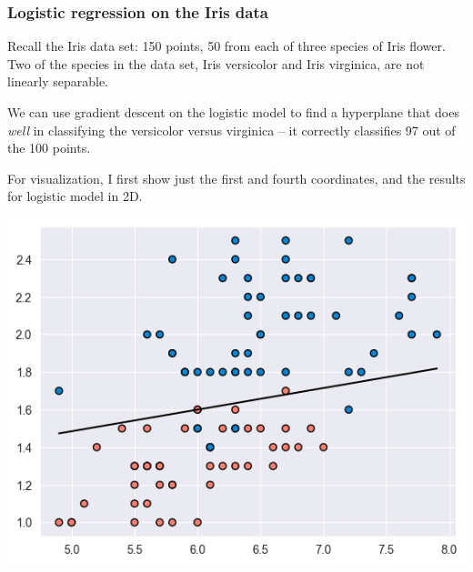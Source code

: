 \documentclass{beamer}
\theoremstyle{example}
\begin{document}
\begin{frame}
    \frametitle{Logistic regression on the Iris data}
    Recall the Iris data set: 150 points, 50 from each of three species of Iris flower. Two of the species in the data set, Iris versicolor and Iris virginica, are not linearly separable.

    We can use gradient descent on the logistic model to find a hyperplane that does \textit{well} in classifying the versicolor versus virginica {--} it correctly classifies 97 out of the 100 points.

    For visualization, I first show just the first and fourth coordinates, and the results for logistic model in 2D.

    \centering
    \includegraphics[height=0.35\textheight]{../../Images/HalfSp_2DIrisData.png}
\end{frame}
\end{document}
